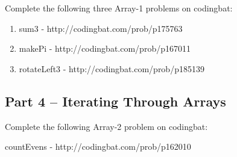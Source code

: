 \begin{exer}
Complete the following three Array-1 problems on codingbat:
\begin{enumerate}
\item sum3 - http://codingbat.com/prob/p175763
\item makePi - http://codingbat.com/prob/p167011
\item rotateLeft3 - http://codingbat.com/prob/p185139

\end{enumerate}
\end{exer}

\initialbox
\subsection{Part 4 -- Iterating Through Arrays}

\begin{exer}
Complete the following Array-2 problem on codingbat:

countEvens - http://codingbat.com/prob/p162010

\end{exer}

\initialbox
